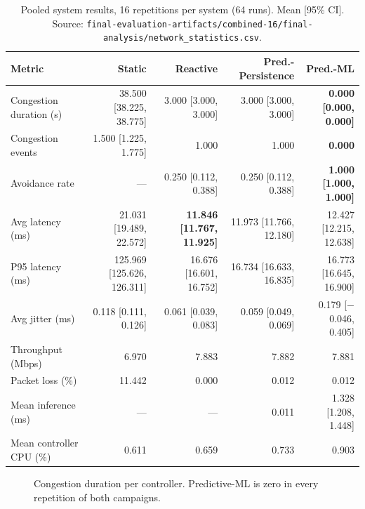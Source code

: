 \documentclass[conference]{IEEEtran}
\begin{document}
\begin{table}[t]
\centering
\caption{Pooled system results, 16 repetitions per system (64 runs).
Mean [95\% CI]. Source:
\texttt{final-evaluation-artifacts/combined-16/final-analysis/network\_statistics.csv}.}
\label{tab:systems}
\begin{tabular}{lrrrr}
\toprule
Metric & Static & Reactive & Pred.-Persistence & Pred.-ML \\
\midrule
Congestion duration (s)      & 38.500 [38.225, 38.775] & 3.000 [3.000, 3.000] & 3.000 [3.000, 3.000] & \textbf{0.000 [0.000, 0.000]} \\
Congestion events            & 1.500 [1.225, 1.775] & 1.000 & 1.000 & \textbf{0.000} \\
Avoidance rate               & --- & 0.250 [0.112, 0.388] & 0.250 [0.112, 0.388] & \textbf{1.000 [1.000, 1.000]} \\
Avg latency (ms)             & 21.031 [19.489, 22.572] & \textbf{11.846 [11.767, 11.925]} & 11.973 [11.766, 12.180] & 12.427 [12.215, 12.638] \\
P95 latency (ms)             & 125.969 [125.626, 126.311] & 16.676 [16.601, 16.752] & 16.734 [16.633, 16.835] & 16.773 [16.645, 16.900] \\
Avg jitter (ms)              & 0.118 [0.111, 0.126] & 0.061 [0.039, 0.083] & 0.059 [0.049, 0.069] & 0.179 [$-$0.046, 0.405] \\
Throughput (Mbps)            & 6.970 & 7.883 & 7.882 & 7.881 \\
Packet loss (\%)             & 11.442 & 0.000 & 0.012 & 0.012 \\
Mean inference (ms)          & --- & --- & 0.011 & 1.328 [1.208, 1.448] \\
Mean controller CPU (\%)     & 0.611 & 0.659 & 0.733 & 0.903 \\
\bottomrule
\end{tabular}
\end{table}

\begin{figure}[t]
\centering
{}
\caption{Congestion duration per controller. Predictive-ML is zero
in every repetition of both campaigns.}
\label{fig:congestion}
\end{figure}
\end{document}
